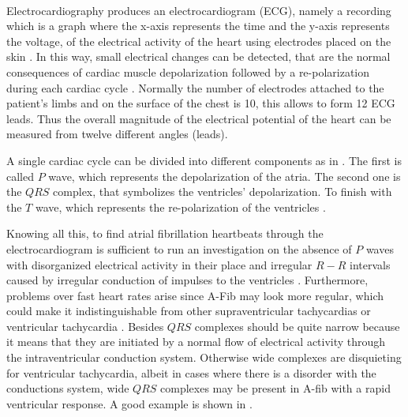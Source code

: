 \\
\label{sec:ecg_diagnose}
Electrocardiography produces an electrocardiogram (ECG), namely a recording which is a graph where the x-axis represents the time and the y-axis represents the voltage, of the electrical activity of the heart using electrodes placed on the skin \cite[p.74]{lilly2015pathophysiology}. In this way, small electrical changes can be detected, that are the normal consequences of cardiac muscle depolarization followed by a re-polarization during each cardiac cycle .
Normally the number of electrodes attached to the patient's limbs and on the surface of the chest is 10, this allows to form 12 ECG leads. Thus the overall magnitude of the electrical potential of the heart can be measured from twelve different angles (leads). 

A single cardiac cycle can be divided into different components as in . The first is called $P$ wave, which represents the depolarization of the atria. The second one is the $QRS$ complex, that symbolizes the ventricles' depolarization. To finish with the $T$ wave, which represents the re-polarization of the ventricles \cite[p.80]{lilly2015pathophysiology}.


Knowing all this, to find atrial fibrillation heartbeats through the electrocardiogram is sufficient to run an investigation on the absence of $P$ waves with disorganized electrical activity in their place and irregular $R-R$ intervals caused by irregular conduction of impulses to the ventricles \cite{doi:10.1161/CIRCULATIONAHA.106.177292}. Furthermore, problems over fast heart rates arise since A-Fib may look more regular, which could make it indistinguishable from other supraventricular tachycardias or ventricular tachycardia \cite{issa2009clinical}.
Besides $QRS$ complexes should be quite narrow because it means that they are initiated by a normal flow of electrical activity through the intraventricular conduction system. Otherwise wide complexes are disquieting for ventricular tachycardia, albeit in cases where there is a disorder with the conductions system, wide $QRS$ complexes may be present in A-fib with a rapid ventricular response. A good example is shown in .

